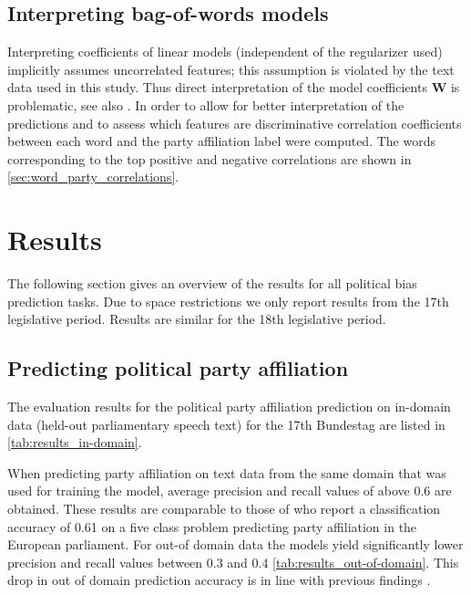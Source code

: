 \documentclass[11pt]{article}
\renewcommand{\vec}[1]{\mathbf{#1}}
\begin{document}
\subsection{Interpreting bag-of-words models}\label{sec:correlations_methods}
Interpreting coefficients of linear models (independent of the regularizer used) implicitly assumes uncorrelated features; this assumption is violated by the text data used in this study. Thus direct interpretation of the model coefficients $\vec{W}$ is problematic, see also \cite{Zien2009, Haufe2013}. In order to allow for better interpretation of the predictions and to assess which features are discriminative correlation coefficients between each word and the party affiliation label were computed. The words corresponding to the top positive and negative correlations are shown in \autoref{sec:word_party_correlations}.

\section{Results}\label{sec:results}

The following section gives an overview of the results for all political bias prediction tasks. 
Due to space restrictions we only report results from the 17th legislative period. Results are similar for the 18th legislative period.

\subsection{Predicting political party affiliation}
The evaluation results for the political party affiliation prediction on in-domain data (held-out parliamentary speech text) for the 17th Bundestag are listed in \autoref{tab:results_in-domain}.

When predicting party affiliation on text data from the same domain that was used for training the model, average precision and recall values of above 0.6 are obtained. These results are comparable to those of \cite{Hirst2014} who report a classification accuracy of 0.61 on a five class problem predicting party affiliation in the European parliament.
For out-of domain data the models yield significantly lower precision and recall values between 0.3 and 0.4 \autoref{tab:results_out-of-domain}. This drop in out of domain prediction accuracy is in line with previous findings \cite{Yu2008}.
\end{document}
